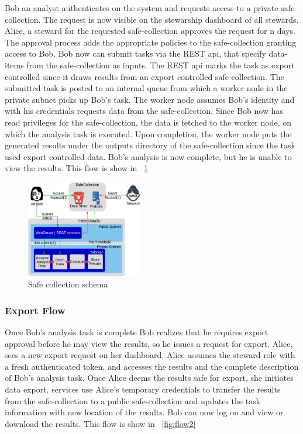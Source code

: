 Bob an analyst authenticates on the system and requests access to a private safe-collection.
The request is now visible on the stewarship dashboard of all stewards. Alice, a steward for the requested
safe-collection approves the request for n days. The approval process adds the appropriate policies to the
safe-collection granting access to Bob. Bob now can submit tasks via the  REST api, that specify data-items
from the safe-collection as inputs. The REST api marks the task as export controlled since it draws results
from an export controlled safe-collection. The submitted task is posted to an internal queue from which a
worker node in the \NAME private subnet picks up Bob's task. The worker node assumes Bob's identity and with
his credentials requests data from the safe-collection. Since Bob now has read privileges for the
safe-collection, the data is fetched to the worker node, on which the analysis task is executed.
Upon completion, the worker node puts the generated results under the outputs directory of the safe-collection
since the task used export controlled data. Bob's analysis is now complete, but he is unable to view the
results. This flow is show in \figurename~\ref{fig:flow1}

\begin{figure}
  \center
  \includegraphics[width=0.45\textwidth]{figures/safe_flow.png}
  \caption{Safe collection schema}
  \label{fig:flow1}
  \vspace{-1.5em}
\end{figure}


\subsubsection{Export Flow}

Once Bob's analysis task is complete Bob realizes that he requires export approval before he may view the
results, so he issues a request for export. Alice, sees a new export request on her dashboard. Alice assumes
the steward role with a fresh authenticated token, and accesses the results and the complete description
of Bob's analysis task. Once Alice deems the results safe for export, she initiates data export. \NAME
services use Alice's temporary credentials to transfer the results from the safe-collection to a public
safe-collection and updates the task information with new location of the results. Bob can now log on
and view or download the results. This flow is show in \figurename~\ref{fig:flow2}

